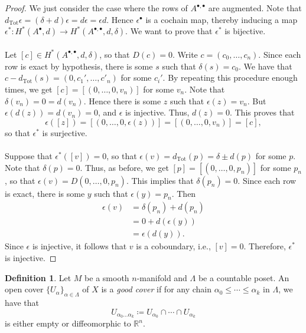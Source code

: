 \documentclass[10pt,letterpaper,cm]{nupset}
\theoremstyle{definition}
\newtheorem{definition}{Definition}[subsection]
\theoremstyle{theorem}
\theoremstyle{remark}
\newcommand{\R}{\mathbb{R}}
\newcommand{\1}{\mathbb{1}}
\newcommand{\0}{\vec 0}
\DeclareMathOperator{\tot}{Tot}
\begin{document}
\begin{proof}
We just consider the case where the rows of $A^{\bullet, \bullet}$ are augmented. Note that $d_{\tot}{\epsilon} = (\delta + d){\epsilon} = d{\epsilon} = \epsilon{d}$. Hence $\epsilon^{\bullet}$ is a cochain map, thereby inducing a map $\epsilon^{\ast} : H^{\ast}(A^{\bullet}, d) \to H^{\ast}(A^{\bullet, \bullet}, d, \delta)$. We want to prove that $\epsilon^{\ast}$ is bijective. 
\\ \\
Let $[c] \in H^{\ast}(A^{\bullet, \bullet}, d, \delta)$, so that $D(c) =0$. Write $c= (c_0, \ldots, c_n)$. Since each row is exact by hypothesis, there is some $s$ such that $\delta(s) = c_0$. We have that $c- d_{\tot}(s) = (0, c_1', \ldots, c'_n)$ for some $c_i'$. By repeating this procedure enough times, we get $[c] = [(0, \ldots, 0, v_n)]$ for some $v_n$. Note that $\delta(v_n) =0 = d(v_n)$. Hence there is some $z$ such that $\epsilon(z) = v_n$.   But $\epsilon(d(z)) = d(v_n) =0$, and $\epsilon$ is injective. Thus, $d(z) =0$. This proves that $$\epsilon([z]) = [(0, \ldots, 0, \epsilon(z))]  = [(0, \ldots, 0, v_n)] = [c],$$ so that $\epsilon^{\ast}$ is surjective.
\\ \\ Suppose that $\epsilon^{\ast}([v]) =0$, so that  $\epsilon(v) = d_{\tot}(p) = \delta \pm d(p)$ for some $p$. Note that $\delta(p) =0$. Thus, as before, we get $[p] = [(0, \ldots, 0, p_n)]$ for some $p_n$, so that $\epsilon(v) = D(0, \ldots, 0, p_n)$. This implies that $\delta(p_n) =0$. Since each row is exact, there is some $y$ such that $\epsilon(y) = p_n$. Then 
\begin{align*}
\epsilon(v) & = \delta(p_n) +d(p_n) 
\\ &= 0 + d(\epsilon(y))
\\ & =  \epsilon(d(y)).
\end{align*}
Since $\epsilon$ is injective, it follows that $v$ is a coboundary, i.e., $[v]=0$. Therefore, $\epsilon^{\ast}$ is injective. 
\end{proof}

\begin{definition}
Let $M$ be a smooth $n$-manifold and $\Lambda$ be a countable poset. An open cover $\{U_{\alpha}\}_{\alpha \in \Lambda}$ of $X$ is a \textit{good cover} if for any chain $\alpha_0\leq \cdots \leq \alpha_k$ in $\Lambda$, we have that $$U_{\alpha_0\ldots \alpha_k}\coloneqq  U_{\alpha_0} \cap \cdots \cap U_{\alpha_k}$$ is either empty or diffeomorphic to $\R^n$.
\end{definition}
\end{document}
